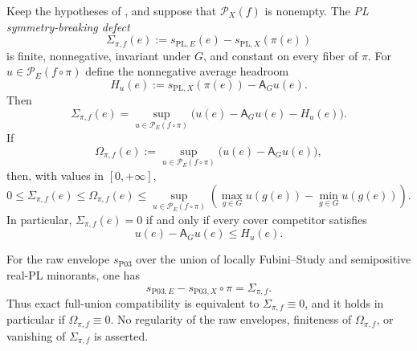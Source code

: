 \begin{theorem}
\label{thm:p031-centered-symmetry-defect}
Keep the hypotheses of , and suppose
that $\mathcal P_X(f)$ is nonempty.  The \emph{PL symmetry-breaking defect}
\begin{equation}
\label{eq:p031-pl-symmetry-defect}
 \Sigma_{\pi,f}(e)
   :=s_{\mathrm{PL},E}(e)-s_{\mathrm{PL},X}(\pi(e))
\end{equation}
is finite, nonnegative, invariant under $G$, and constant on every fiber of
$\pi$.  For $u\in\mathcal P_E(f\circ\pi)$ define the nonnegative average
headroom
\begin{equation}
\label{eq:p031-average-headroom}
 H_u(e):=s_{\mathrm{PL},X}(\pi(e))-\mathsf A_Gu(e).
\end{equation}
Then
\begin{equation}
\label{eq:p031-centered-symmetry-formula}
 \Sigma_{\pi,f}(e)
   =\sup_{u\in\mathcal P_E(f\circ\pi)}
       \bigl(u(e)-\mathsf A_Gu(e)-H_u(e)\bigr).
\end{equation}
If
\begin{equation}
\label{eq:p031-orbit-asymmetry-budget}
 \Omega_{\pi,f}(e)
   :=\sup_{u\in\mathcal P_E(f\circ\pi)}
        \bigl(u(e)-\mathsf A_Gu(e)\bigr),
\end{equation}
then, with values in $[0,+\infty]$,
\begin{equation}
\label{eq:p031-symmetry-oscillation-bounds}
 0\leq\Sigma_{\pi,f}(e)
   \leq\Omega_{\pi,f}(e)
   \leq
   \sup_{u\in\mathcal P_E(f\circ\pi)}
       \left(
        \max_{g\in G}u(g(e))-\min_{g\in G}u(g(e))
       \right).
\end{equation}
In particular, $\Sigma_{\pi,f}(e)=0$ if and only if every cover competitor
satisfies
\begin{equation}
\label{eq:p031-pointwise-symmetry-criterion}
                 u(e)-\mathsf A_Gu(e)\leq H_u(e).
\end{equation}

For the raw envelope $s_{\mathrm{P03}}$ over the union of locally
Fubini--Study and semipositive real-PL minorants, one has
\begin{equation}
\label{eq:p031-full-union-symmetry-defect}
 s_{\mathrm{P03},E}-s_{\mathrm{P03},X}\circ\pi
     =\Sigma_{\pi,f}.
\end{equation}
Thus exact full-union compatibility is equivalent to
$\Sigma_{\pi,f}\equiv0$, and it holds in particular if
$\Omega_{\pi,f}\equiv0$.  No regularity of the raw envelopes, finiteness of
$\Omega_{\pi,f}$, or vanishing of $\Sigma_{\pi,f}$ is asserted.
\end{theorem}
